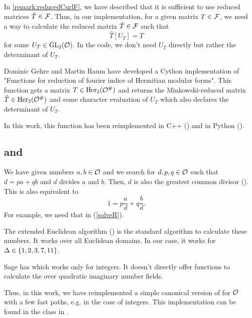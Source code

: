 \subsection{}
\label{impl:reduceGL}
\label{reduceGL}
In \cref{remark:reducedCurlF}, we have described that it is sufficient to use reduced matrices $\hat{T} \in \mathcal{F}$. Thus, in our implementation, for a given matrix $T \in \mathcal{F}$, we need a way to calculate the reduced matrix $\hat{T} \in \mathcal{F}$ such that
\[ \hat{T}[U_T] = T \]
for some $U_T \in \operatorname{GL}_2(\mathcal{O})$. In the code, we don't need $U_T$ directly but rather the determinant of $U_T$.

Dominic Gehre and Martin Raum have developed a Cython implementation \cite{Raum09reduceGL} of "Functions for reduction of fourier indice of Hermitian modular forms". This function  gets a matrix $T \in \operatorname{Her}_2(\mathcal{O}^\#)$ and returns the Minkowski-reduced matrix $\hat{T} \in \operatorname{Her}_2(\mathcal{O}^\#)$ and some character evaluation of $U_T$ which also declares the determinant of $U_T$.

In this work, this function  has been reimplemented in C++ () and in Python ().


\subsection{ and }
\label{xgcd}

We have given numbers $a,b \in \mathcal{O}$ and we search for $d,p,q \in \mathcal{O}$ such that $d = pa + qb$ and $d$ divides $a$ and $b$. Then, $d$ is also the greatest common divisor (). This is also equivalent to
\[ 1 = p \frac{a}{d} + q \frac{b}{d} . \]
%
For example, we need that in  (\cref{solveR}).

The extended Euclidean algorithm () is the standard algorithm to calculate these numbers. It works over all Euclidean domains. In our case, it works for $\Delta \in \Set{1, 2, 3, 7, 11}$.

Sage has  which works only for integers. It doesn't directly offer functions to calculate the  over quadratic imaginary number fields.

Thus, in this work, we have reimplemented a simple canonical version of  for $\mathcal{O}$ with a few fast paths, e.g. in the case of integers. This implementation can be found in the class  in .

